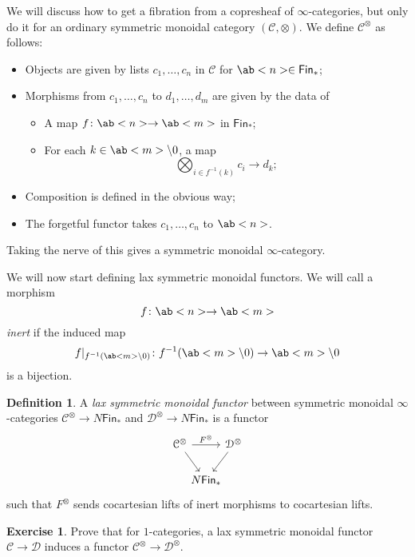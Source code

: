 \documentclass[10pt]{amsart}
\theoremstyle{definition}
\newtheorem{defn}[thm]{Definition}
\newtheorem{exer}[thm]{Exercise}
\theoremstyle{remark}
\theoremstyle{plain}
\theoremstyle{definition}
\theoremstyle{remark}
\newcommand{\mc}[1]{\mathcal{#1}}
\newcommand{\ms}[1]{\mathsf{#1}}
\newcommand{\1}{\mathbf{1}}
\newcommand{\2}{\mathbf{2}}
\newcommand{\3}{\mathbf{3}}
\begin{document}
We will discuss how to get a fibration from a copresheaf of $\infty$-categories, but only do it for an ordinary symmetric monoidal category $(\mc{C}, \otimes)$. We define $\mc{C}^{\otimes}$ as follows:
\begin{itemize}
    \item Objects are given by lists $c_1, \ldots, c_n$ in $\mc{C}$ for $\ab<n> \in \ms{Fin}_*$;
    \item Morphisms from $c_1, \ldots, c_n$ to $d_1, \ldots, d_m$ are given by the data of
    \begin{itemize}
        \item A map $f \colon \ab<n> \to \ab<m>$ in $\ms{Fin}_*$;
        \item For each $k \in \ab<m> \setminus 0$, a map
        \[ \bigotimes_{i \in f^{-1}(k)} c_i \to d_k; \]
    \end{itemize}
    \item Composition is defined in the obvious way;
    \item The forgetful functor takes $c_1, \ldots, c_n$ to $\ab<n>$.
\end{itemize}
Taking the nerve of this gives a symmetric monoidal $\infty$-category.

We will now start defining lax symmetric monoidal functors. We will call a morphism
\[ f \colon \ab<n> \to \ab<m> \]
\textit{inert} if the induced map
\[ f |_{f^{-1}(\ab<m> \setminus 0)} \colon f^{-1}(\ab<m> \setminus 0) \to \ab<m> \setminus 0 \]
is a bijection.

\begin{defn}
    A \textit{lax symmetric monoidal functor} between symmetric monoidal $\infty$-categories $\mc{C}^{\otimes} \to N\ms{Fin}_*$ and $\mc{D}^{\otimes} \to N\ms{Fin}_*$ is a functor
    \begin{equation*}
    \begin{tikzcd}[column sep=-0.5em]
        \mc{C}^{\otimes} \ar{rr}{F^{\otimes}} \ar{dr} & & \mc{D}^{\otimes} \ar{dl} \\
        & N\ms{Fin}_*
    \end{tikzcd}
    \end{equation*}
    such that $F^{\otimes}$ sends cocartesian lifts of inert morphisms to cocartesian lifts.
\end{defn}

\begin{exer}
    Prove that for $1$-categories, a lax symmetric monoidal functor $\mc{C} \to \mc{D}$ induces a functor $\mc{C}^{\otimes} \to \mc{D}^{\otimes}$.
\end{exer}
\end{document}
